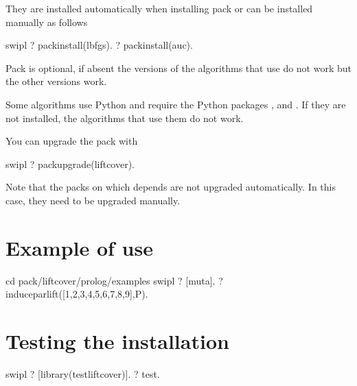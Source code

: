 \documentclass[letterpaper,10pt,english]{sphinxmanual}
\begin{document}
\sphinxAtStartPar
They are installed automatically when installing pack  or can be installed manually as follows

\begin{sphinxVerbatim}[commandchars=\\\{\}]
\PYGZdl{} swipl
?\PYGZhy{} pack\PYGZus{}install(lbfgs).
?\PYGZhy{} pack\PYGZus{}install(auc).
\end{sphinxVerbatim}

\sphinxAtStartPar
Pack  is optional, if absent the versions of the algorithms that use   do not work but the other versions work.

\sphinxAtStartPar
Some algorithms use Python and require the Python packages ,  and .
If they are not installed, the algorithms that use them do not work.

\sphinxAtStartPar
You can upgrade the pack with

\begin{sphinxVerbatim}[commandchars=\\\{\}]
\PYGZdl{} swipl
?\PYGZhy{} pack\PYGZus{}upgrade(liftcover).
\end{sphinxVerbatim}

\sphinxAtStartPar
Note that the packs on which  depends are not upgraded automatically.
In this case, they need to be upgraded manually.


\section{Example of use}
\label{\detokenize{index:example-of-use}}
\begin{sphinxVerbatim}[commandchars=\\\{\}]
\PYGZdl{} cd \PYGZlt{}pack\PYGZgt{}/liftcover/prolog/examples
\PYGZdl{} swipl
?\PYGZhy{} [muta].
?\PYGZhy{} induce\PYGZus{}par\PYGZus{}lift([1,2,3,4,5,6,7,8,9],P).
\end{sphinxVerbatim}


\section{Testing the installation}
\label{\detokenize{index:testing-the-installation}}
\begin{sphinxVerbatim}[commandchars=\\\{\}]
\PYGZdl{} swipl
?\PYGZhy{} [library(test\PYGZus{}liftcover)].
?\PYGZhy{} test.
\end{sphinxVerbatim}
\end{document}
